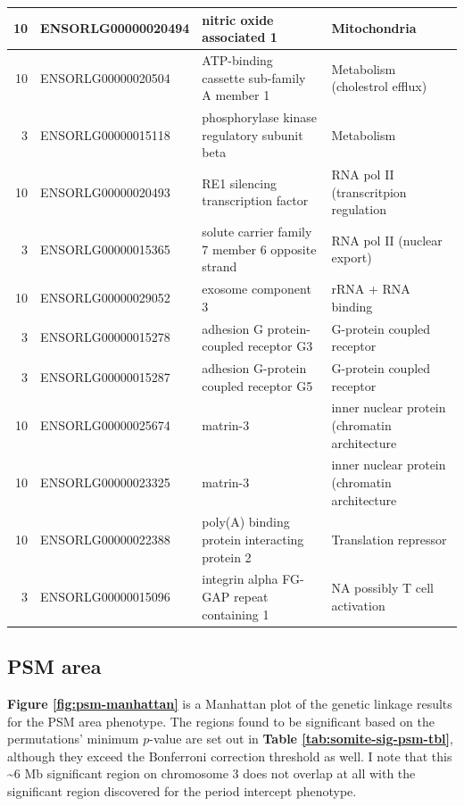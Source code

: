 \documentclass[
]{book}
\begin{document}
\begin{table}
\begin{tabular}[t]{r|l|l|l}
\hline
10 & ENSORLG00000020494 & nitric oxide associated 1 & Mitochondria\\
\hline
10 & ENSORLG00000020504 & ATP-binding cassette sub-family A member 1 & Metabolism (cholestrol efflux)\\
\hline
3 & ENSORLG00000015118 & phosphorylase kinase regulatory subunit beta & Metabolism\\
\hline
10 & ENSORLG00000020493 & RE1 silencing transcription factor & RNA pol II (transcritpion regulation\\
\hline
3 & ENSORLG00000015365 & solute carrier family 7 member 6 opposite strand & RNA pol II (nuclear export)\\
\hline
10 & ENSORLG00000029052 & exosome component 3 & rRNA + RNA binding\\
\hline
3 & ENSORLG00000015278 & adhesion G protein-coupled receptor G3 & G-protein coupled receptor\\
\hline
3 & ENSORLG00000015287 & adhesion G-protein coupled receptor G5 & G-protein coupled receptor\\
\hline
10 & ENSORLG00000025674 & matrin-3 & inner nuclear protein (chromatin architecture\\
\hline
10 & ENSORLG00000023325 & matrin-3 & inner nuclear protein (chromatin architecture\\
\hline
10 & ENSORLG00000022388 & poly(A) binding protein interacting protein 2 & Translation repressor\\
\hline
3 & ENSORLG00000015096 & integrin alpha FG-GAP repeat containing 1 & NA possibly T cell activation\\
\hline
\end{tabular}
\end{table}

\hypertarget{psm-area-1}{%
\subsection{PSM area}\label{psm-area-1}}

\textbf{Figure \ref{fig:psm-manhattan}} is a Manhattan plot of the genetic linkage results for the PSM area phenotype. The regions found to be significant based on the permutations' minimum \(p\)-value are set out in \textbf{Table \ref{tab:somite-sig-psm-tbl}}, although they exceed the Bonferroni correction threshold as well. I note that this \textasciitilde6 Mb significant region on chromosome 3 does not overlap at all with the significant region discovered for the period intercept phenotype.
\end{document}
